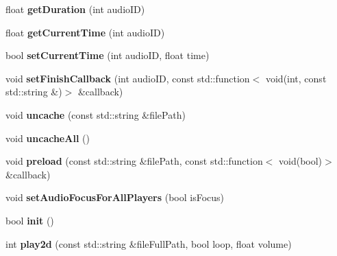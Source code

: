 \begin{DoxyCompactItemize}
float {\bfseries get\+Duration} (int audio\+ID)
\item 
\mbox{\label{classexperimental_1_1AudioEngineImpl_a47be5365efeebd307e3891f3f71386f0}} 
float {\bfseries get\+Current\+Time} (int audio\+ID)
\item 
\mbox{\label{classexperimental_1_1AudioEngineImpl_a8abd3b8330fb7ca7f513016055333f9c}} 
bool {\bfseries set\+Current\+Time} (int audio\+ID, float time)
\item 
\mbox{\label{classexperimental_1_1AudioEngineImpl_ab4bc0ee1754fda9638d7d0c4470cf170}} 
void {\bfseries set\+Finish\+Callback} (int audio\+ID, const std\+::function$<$ void(int, const std\+::string \&)$>$ \&callback)
\item 
\mbox{\label{classexperimental_1_1AudioEngineImpl_a4ad8d3d499bf3e5fd262d710b215891e}} 
void {\bfseries uncache} (const std\+::string \&file\+Path)
\item 
\mbox{\label{classexperimental_1_1AudioEngineImpl_ae439dacc5acebf311686ebf6f1f6b3df}} 
void {\bfseries uncache\+All} ()
\item 
\mbox{\label{classexperimental_1_1AudioEngineImpl_a6355342a5e98b205d7399d8aea66a924}} 
void {\bfseries preload} (const std\+::string \&file\+Path, const std\+::function$<$ void(bool)$>$ \&callback)
\item 
\mbox{\label{classexperimental_1_1AudioEngineImpl_a8d41947ad360284ac613507ab147c4ac}} 
void {\bfseries set\+Audio\+Focus\+For\+All\+Players} (bool is\+Focus)
\item 
\mbox{\label{classexperimental_1_1AudioEngineImpl_a908e5136201a8a6b53ae5c292329f82b}} 
bool {\bfseries init} ()
\item 
\mbox{\label{classexperimental_1_1AudioEngineImpl_a04b788a8319f5d7f90e297a2a345f745}} 
int {\bfseries play2d} (const std\+::string \&file\+Full\+Path, bool loop, float volume)

\end{DoxyCompactItemize}
